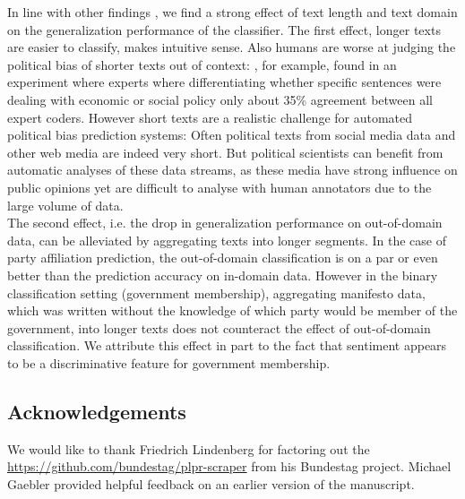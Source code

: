 \documentclass[11pt]{article}
\begin{document}
In line with other findings \cite{Yu2008, Hirst2014}, we find a strong effect of text length and text domain on the generalization performance of the classifier. The first effect, longer texts are easier to classify, makes intuitive sense. Also humans are worse at judging the political bias of shorter texts out of context: \cite{Benoit.Forthcoming}, for example, found in an experiment where experts where differentiating whether specific sentences were dealing with economic or social policy only about 35\% agreement between all expert coders. However short texts are a realistic challenge for automated political bias prediction systems: Often political texts from social media data and other web media are indeed very short. But political scientists can benefit from automatic analyses of these data streams, as these media have strong influence on public opinions yet are difficult to analyse with human annotators due to the large volume of data. \\
The second effect, i.e. the drop in generalization performance on out-of-domain data, can be alleviated by aggregating texts into longer segments. In the case of party affiliation prediction, the out-of-domain classification is on a par or even better than the prediction accuracy on in-domain data. However in the binary classification setting (government membership), aggregating manifesto data, which was written without the knowledge of which party would be member of the government, into longer texts does not counteract the effect of out-of-domain classification. We attribute this effect in part to the fact that sentiment appears to be a discriminative feature for government membership. 

\subsection*{Acknowledgements}
We would like to thank Friedrich Lindenberg for factoring out the \url{https://github.com/bundestag/plpr-scraper} from his Bundestag project. Michael Gaebler provided helpful feedback on an earlier version of the manuscript. \\
%
\newpage
\small{


}
\end{document}
